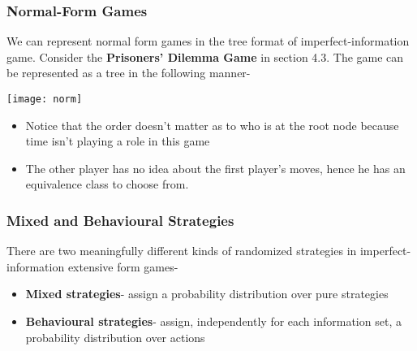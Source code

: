 \subsubsection{Normal-Form Games}
We can represent normal form games in the tree format of imperfect-information game. Consider the \textbf{Prisoners' Dilemma Game} in section 4.3. The game can be represented as a tree in the following manner-
 \begin{center}
\texttt{[image: norm]}
\end{center}
\begin{itemize}
\item Notice that the order doesn't matter as to who is at the root node because time isn't playing a role in this game
\item The other player has no idea about the first player's moves, hence he has an equivalence class to choose from.
\end{itemize} 
\subsubsection{Mixed and Behavioural Strategies}
There are two meaningfully different kinds of randomized strategies in imperfect-information extensive form games-
\begin{itemize}
\item \textbf{Mixed strategies}-  assign a probability distribution over pure strategies
\item \textbf{Behavioural strategies}- assign, independently for each information set, a probability distribution over actions
\end{itemize}